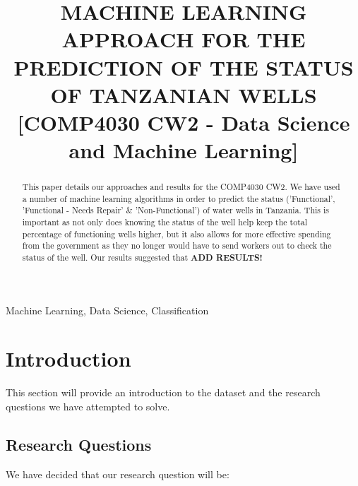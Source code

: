 \documentclass[conference]{IEEEtran}
\begin{document}
\title{MACHINE LEARNING APPROACH FOR THE PREDICTION OF THE STATUS OF TANZANIAN WELLS [COMP4030 CW2 - Data Science and Machine Learning]
}

\author{
\and
{}
}

\maketitle

\begin{abstract}
  This paper details our approaches and results for the COMP4030 CW2. We have used a number of machine learning algorithms in order to predict the status ('Functional', 'Functional - Needs Repair' \& 'Non-Functional') of water wells in Tanzania. This is important as not only does knowing the status of the well help keep the total percentage of functioning wells higher, but it also allows for more effective spending from the government as they no longer would have to send workers out to check the status of the well. Our results suggested that \textbf{ADD RESULTS!}
\end{abstract}

\begin{IEEEkeywords}
  Machine Learning, Data Science, Classification
\end{IEEEkeywords}

\section{Introduction}

This section will provide an introduction to the dataset and the research questions we have attempted to solve.

\subsection{Research Questions}

We have decided that our research question will be: 
\end{document}
